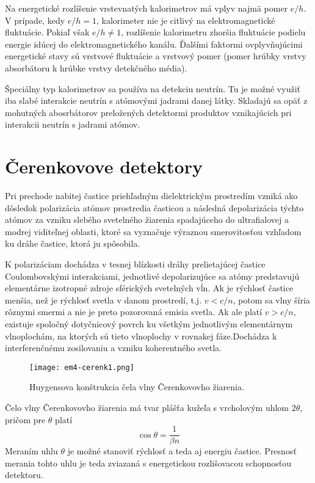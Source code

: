 \documentclass[../../main.tex]{subfiles}
\begin{document}
Na energetické rozlíšenie vrstevnatých kalorimetrov má vplyv najmä pomer $e/h$. V prípade, kedy $e/h=1$, kalorimeter nie je citlivý na elektromagnetické fluktuácie. Pokiaľ však ${e/h\neq 1}$, rozlíšenie kalorimetru zhoršia fluktuácie podielu energie idúcej do elektromagnetického kanálu. Ďalšími faktormi ovplyvňujúcimi energetické stavy sú vrstvové fluktuácie a vrstvový pomer (pomer hrúbky vrstvy absorbátoru k hrúbke vrstvy detekčného média).

Špeciálny typ kalorimetrov sa používa na detekciu neutrín. Tu je možné využiť iba slabé interakcie neutrín s atómovými jadrami danej látky. Skladajú sa opäť z mohutných abosrbátorov preložených detektormi produktov vznikajúcich pri interakcii neutrín s jadrami atómov.


\section{Čerenkovove detektory}

Pri prechode nabitej častice priehľadným dielektrickým prostredím vzniká ako dôsledok polarizácia atómov prostredia časticou a následná depolarizácia týchto atómov za vzniku slebého svetelného žiarenia spadajúceho do ultrafialovej a modrej viditeľnej oblasti, ktoré sa vyznačuje výraznou smerovitosťou vzhľadom ku dráhe častice, ktorá ju spôsobila.

K polarizáciam dochádza v tesnej blízkosti dráhy prelietajúcej častice Coulombovskými interakciami, jednotlivé depolarizujúce sa atómy predstavujú elementárne izotropné zdroje sférických svetelných vĺn. Ak je rýchlosť častice menšia, než je rýchlosť svetla v danom prostredí, t.j. $v<c/n$, potom sa vlny šíria rôznymi smermi a nie je preto pozorovaná emisia svetla. Ak ale platí $v>c/n$, existuje spoločný dotyčnicový povrch ku všetkým jednotlivým elementárnym vlnoplochám, na ktorých sú tieto vlnoplochy v rovnakej fáze.Dochádza k interferenčnému zosilovaniu a vzniku koherentného svetla.

\begin{figure}[h]
\centering
\texttt{[image: em4-cerenk1.png]}
\caption{Huygensova konštrukcia čela vlny Čerenkovovho žiarenia.}
\label{em4:img:cerenk1}
\end{figure}

Čelo vlny Čerenkovovho žiarenia má tvar plášťa kužeľa s vrcholovým uhlom $2\theta$, pričom pre $\theta$ platí
\begin{equation}
\cos \theta=\dfrac{1}{\beta n}
\end{equation}
Meraním uhlu $\theta$ je možné stanoviť rýchlosť a teda aj energiu častice. Presnosť merania tohto uhlu je teda zviazaná s energetickou rozlišovacou schopnosťou detektoru.
\end{document}
